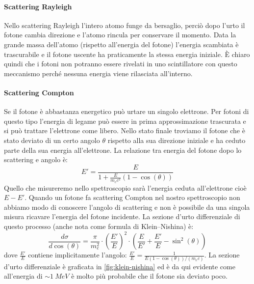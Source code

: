  \paragraph{Scattering Rayleigh}
 Nello scattering Rayleigh l'intero atomo funge da bersaglio, perciò dopo l'urto il fotone cambia direzione e l'atomo rincula per conservare il momento. Data la grande massa dell'atomo (rispetto all'energia del fotone) l'energia scambiata è trascurabile e il fotone uscente ha praticamente la stessa energia iniziale. \`E chiaro quindi che i fotoni non potranno essere rivelati in uno scintillatore con questo meccanismo perché nessuna energia viene rilasciata all'interno.
 
 \paragraph{Scattering Compton}
 Se il fotone è abbastanza energetico può urtare un singolo elettrone. Per fotoni di questo tipo l'energia di legame può essere in prima approssimazione trascurata e si può trattare l'elettrone come libero. Nello stato finale troviamo il fotone che è stato deviato di un certo angolo $\theta$ rispetto alla sua direzione iniziale e ha ceduto parte della sua energia all'elettrone. La relazione tra energia del fotone dopo lo scattering e angolo è:
 \begin{equation}
 \label{energia_compton}
 E' = \frac{E}{1+\frac{E}{m_ec^2}(1-\cos(\theta))}   
 \end{equation}
 Quello che misureremo nello spettroscopio sarà l'energia ceduta all'elettrone cioè $E-E'$. Quando un fotone fa scattering Compton nel nostro spettroscopio non abbiamo modo di conoscere l'angolo di scattering e non è possibile da una singola misura ricavare l'energia del fotone incidente.
 La sezione d'urto differenziale di questo processo (anche nota come formula di Klein–Nishina) è:
 \begin{equation}
 \label{klein-nishina}
 \frac{d\sigma}{d\cos(\theta)} = \frac{\pi}{m_e^2} \cdot\left(\frac{E'}{E}\right)^2 \cdot \left(\frac{E}{E'} + \frac{E'}{E} - \sin^2(\theta)\right)
 \end{equation}
 dove $\frac{E'}{E}$ contiene implicitamente l'angolo: $\frac{E'}{E} = \frac{1}{E(1-\cos(\theta))/(m_ec)}$.
 La sezione d'urto differenziale è graficata in \autoref{fig:klein-nishina} ed è da qui evidente come all'energia di $\sim \SI{1}{MeV}$ è molto più probabile che il fotone sia deviato poco.
 
